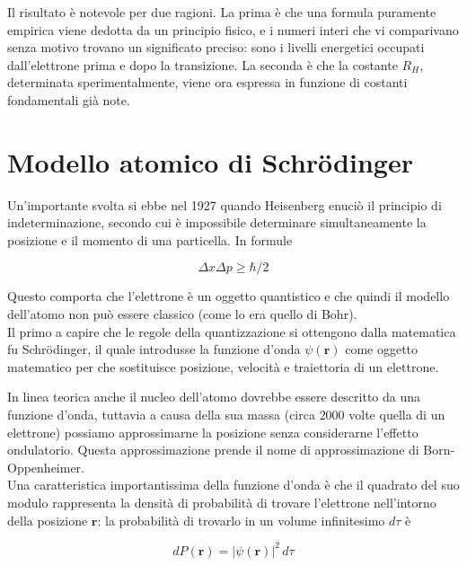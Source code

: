 Il risultato è notevole per due ragioni. La prima è che una formula puramente empirica viene dedotta da un principio fisico, e i numeri interi che vi comparivano senza motivo trovano un significato preciso: sono i livelli energetici occupati dall'elettrone prima e dopo la transizione. 
La seconda è che la costante $R_H$, determinata sperimentalmente, viene ora espressa in funzione di costanti fondamentali già note.

\newpage

\section{Modello atomico di Schrödinger}

Un'importante svolta si ebbe nel 1927 quando Heisenberg enuciò il principio di indeterminazione, secondo cui è impossibile determinare simultaneamente la posizione e il momento di una particella. In formule 

\begin{equation}
    \Delta x \Delta p \geq \hbar/2
    \label{principio_indeterminazione}
\end{equation}

Questo comporta che l'elettrone è un oggetto quantistico e che quindi il modello dell'atomo non può essere classico (come lo era quello di Bohr).\\

Il primo a capire che le regole della quantizzazione si ottengono dalla matematica fu Schrödinger, il quale introdusse la funzione d'onda $\psi(\mathbf{r})$ come oggetto matematico per che sostituisce posizione, velocità e traiettoria di un elettrone.

In linea teorica anche il nucleo dell'atomo dovrebbe essere descritto da una funzione d'onda, tuttavia a causa della sua massa (circa $2000$ volte quella di un elettrone) possiamo approssimarne la posizione senza considerarne l'effetto ondulatorio. Questa approssimazione prende il nome di approssimazione di Born-Oppenheimer.\\

Una caratteristica importantissima della funzione d'onda è che il quadrato del suo modulo rappresenta la densità di probabilità di trovare l'elettrone nell'intorno della posizione $\mathbf{r}$: la probabilità di trovarlo in un volume infinitesimo $d\tau$ è

\begin{equation}
    dP(\mathbf{r}) = |\psi(\mathbf{r})|^2 \, d\tau
\end{equation}

